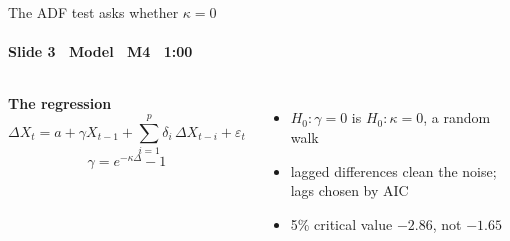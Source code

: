 \begin{frame}{The ADF test asks whether $\kappa=0$}
\framesubtitle{Slide 3 \textbullet\ Model \textbullet\ M4 \textbullet\ 1:00}
\vspace{-2pt}
\begin{columns}[T,onlytextwidth]
  \normalsize\raggedright
  \textbf{\color{deckAccent}The regression}
  {\small\[ \Delta X_t=a+\gamma X_{t-1}+\sum_{i=1}^{p}\delta_i\,\Delta X_{t-i}+\varepsilon_t \]
  \[ \gamma=e^{-\kappa\Delta}-1 \]}
  \normalsize\raggedright
  \begin{itemize}\setlength{\itemsep}{2pt}
    \item $H_0:\gamma=0$ is $H_0:\kappa=0$, a random walk
    \item lagged differences clean the noise; lags chosen by AIC
    \item 5\% critical value $-2.86$, not $-1.65$
  \end{itemize}
\end{columns}
\end{frame}
